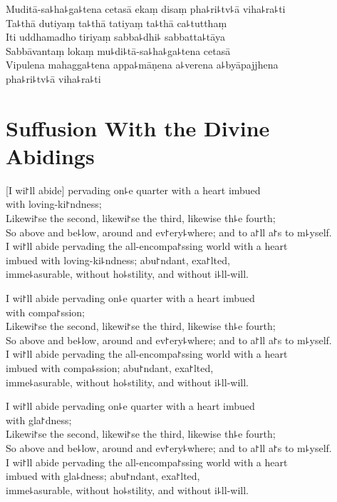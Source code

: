 Muditā-sa꜕ha꜕ga꜕tena cetasā ekaṃ disaṃ pha꜕ri꜕tv꜕ā viha꜕ra꜕ti\\
Ta꜕thā dutiyaṃ ta꜕thā tatiyaṃ ta꜕thā ca꜕tutthaṃ\\
Iti uddhamadho tiriyaṃ sabba꜕dhi꜕ sabbatta꜕tāya\\
Sabbāvantaṃ lokaṃ mu꜕di꜕tā-sa꜕ha꜕ga꜕tena cetasā\\
Vipulena mahagga꜕tena appa꜕māṇena a꜕verena a꜕byāpajjhena\\
\vin pha꜕ri꜕tv꜕ā viha꜕ra꜕ti

\chapter[Divine Abidings]{Suffusion With the Divine Abidings}%


\begin{leader}
\end{leader}

[I wi꜓ll abide] pervading on꜕e quarter with a heart imbued\\
\vin with loving-ki꜓ndness;\\
Likewi꜓se the second, likewi꜓se the third, likewise th꜕e fourth;\\
So above and be꜕low, around and ev꜓ery꜕where; and to a꜓ll a꜓s to m꜕yself.\\
I wi꜓ll abide pervading the all-encompa꜓ssing world with a heart \\
\vin imbued with loving-ki꜕ndness; abu꜓ndant, exa꜓lted,\\
\vin imme꜕asurable, without ho꜕stility, and without i꜕ll-will.

I wi꜓ll abide pervading on꜕e quarter with a heart imbued\\
\vin with compa꜓ssion;\\
Likewi꜓se the second, likewi꜓se the third, likewise th꜕e fourth;\\
So above and be꜕low, around and ev꜓ery꜕where; and to a꜓ll a꜓s to m꜕yself.\\
I wi꜓ll abide pervading the all-encompa꜓ssing world with a heart \\
\vin imbued with compa꜕ssion; abu꜓ndant, exa꜓lted,\\
\vin imme꜕asurable, without ho꜕stility, and without i꜕ll-will.

I wi꜓ll abide pervading on꜕e quarter with a heart imbued\\
\vin with gla꜓dness;\\
Likewi꜓se the second, likewi꜓se the third, likewise th꜕e fourth;\\
So above and be꜕low, around and ev꜓ery꜕where; and to a꜓ll a꜓s to m꜕yself.\\
I wi꜓ll abide pervading the all-encompa꜓ssing world with a heart \\
\vin imbued with gla꜕dness; abu꜓ndant, exa꜓lted,\\
\vin imme꜕asurable, without ho꜕stility, and without i꜕ll-will.

